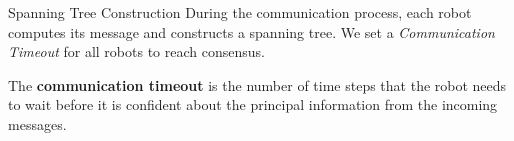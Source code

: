 \begin{frame}{Spanning Tree Construction}
\small{During the communication process, each robot computes its message and constructs a spanning tree. We set a \emph{Communication Timeout} for all robots to reach consensus.}
  \begin{definition}
    The \textbf{communication timeout} is the number of time steps that the robot
    needs to wait before it is confident about the principal information from the
    incoming messages.
  \end{definition}
  
\end{frame}